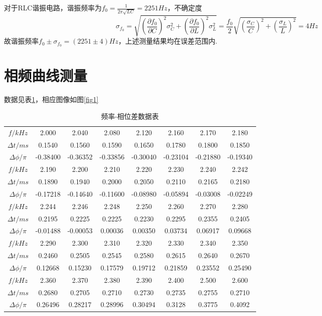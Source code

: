 \documentclass[12pt, a4paper]{ctexart}
\begin{document}
对于RLC谐振电路，谐振频率为$f_0 = \frac{1}{2\pi \sqrt{LC}} = 2251 Hz$，不确定度
\begin{equation*}
    \sigma_{f_0} = \sqrt{(\frac{\partial f_0}{\partial C})^2 \sigma_C^2 + (\frac{\partial f_0}{\partial L})^2 \sigma_L^2} = \frac{f_0}{2} \sqrt{(\frac{\sigma_C}{C})^2 + (\frac{\sigma_L}{L})^2} = 4Hz
\end{equation*}
故谐振频率$f_0 \pm \sigma_{f_0} = (2251 \pm 4) Hz$，上述测量结果均在误差范围内.

\section{相频曲线测量}
数据见表\ref{tab:t1}，相应图像如图\ref{fig1}\\
\begin{table}[htbp]
  \centering
  \caption{频率-相位差数据表}
    \begin{tabular}{c|ccccccc}
    \toprule
    $f/kHz$      & 2.000 & 2.040 & 2.080 & 2.120 & 2.160 & 2.170 & 2.180 \\
    $\Delta t/ms$& 0.1540 & 0.1560 & 0.1590 & 0.1650 & 0.1780 & 0.1800 & 0.1850 \\
    $\Delta \phi /\pi$ & -0.38400 & -0.36352 & -0.33856 & -0.30040 & -0.23104 & -0.21880& -0.19340 \\
    \midrule
    $f/kHz$      & 2.190 & 2.200 & 2.210 & 2.220 & 2.230 & 2.240 & 2.242 \\
    $\Delta t/ms$& 0.1890 & 0.1940 & 0.2000 & 0.2050 & 0.2110 & 0.2165 & 0.2180\\
    $\Delta \phi /\pi$ & -0.17218& -0.14640& -0.11600& -0.08980& -0.05894 & -0.03008 & -0.02249 \\
    \midrule
    $f/kHz$      & 2.244 & 2.246 & 2.248 & 2.250 & 2.260 & 2.270 & 2.280 \\ 
    $\Delta t/ms$& 0.2195 & 0.2225 & 0.2225 & 0.2230 & 0.2295 & 0.2355 & 0.2405 \\
    $\Delta \phi /\pi$ & -0.01488 & -0.00053 & 0.00036 & 0.00350 & 0.03734 & 0.06917 & 0.09668 \\
    \midrule
    $f/kHz$      & 2.290 & 2.300 & 2.310 & 2.320 & 2.330 & 2.340 & 2.350 \\
    $\Delta t/ms$& 0.2460 & 0.2505 & 0.2545 & 0.2580 & 0.2615 & 0.2640 & 0.2670 \\
    $\Delta \phi /\pi$ & 0.12668 & 0.15230 & 0.17579 & 0.19712 & 0.21859 & 0.23552 & 0.25490 \\
    \midrule
    $f/kHz$      & 2.360 & 2.370 & 2.380 & 2.390 & 2.400 & 2.500 & 2.600 \\
    $\Delta t/ms$& 0.2680 & 0.2705 & 0.2710 & 0.2730 & 0.2735 & 0.2755 & 0.2710 \\
    $\Delta \phi /\pi$ & 0.26496 & 0.28217 & 0.28996 & 0.30494 & 0.3128 & 0.3775 & 0.4092 \\
    \bottomrule
    \end{tabular}
  \label{tab:t1}
\end{table}
\end{document}
